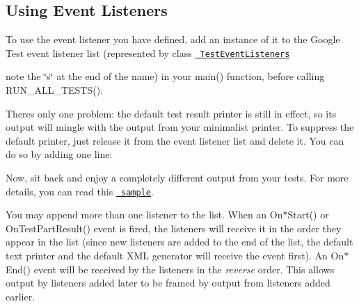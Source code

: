 \subsection*{Using Event Listeners}

To use the event listener you have defined, add an instance of it to the Google Test event listener list (represented by class \href{../include/gtest/gtest.h#L1064}\texttt{ Test\+Event\+Listeners}
\begin{DoxyItemize}
\item note the \char`\"{}s\char`\"{} at the end of the name) in your {\ttfamily main()} function, before calling {\ttfamily R\+U\+N\+\_\+\+A\+L\+L\+\_\+\+T\+E\+S\+T\+S()}\+: 
\begin{DoxyCode}{0}
\DoxyCodeLine{\}}
\end{DoxyCode}

\end{DoxyItemize}

There\textquotesingle{}s only one problem\+: the default test result printer is still in effect, so its output will mingle with the output from your minimalist printer. To suppress the default printer, just release it from the event listener list and delete it. You can do so by adding one line\+: 
\begin{DoxyCode}{0}
\end{DoxyCode}


Now, sit back and enjoy a completely different output from your tests. For more details, you can read this \href{../samples/sample9_unittest.cc}\texttt{ sample}.

You may append more than one listener to the list. When an {\ttfamily On$\ast$\+Start()} or {\ttfamily On\+Test\+Part\+Result()} event is fired, the listeners will receive it in the order they appear in the list (since new listeners are added to the end of the list, the default text printer and the default X\+ML generator will receive the event first). An {\ttfamily On$\ast$\+End()} event will be received by the listeners in the {\itshape reverse} order. This allows output by listeners added later to be framed by output from listeners added earlier.

